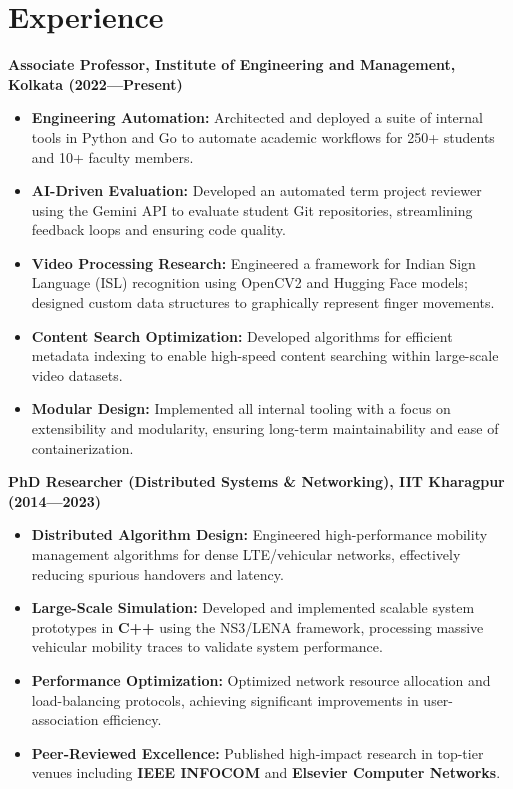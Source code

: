\section{Experience}
\begin{innerlist}
\item
\textbf{Associate Professor, Institute of Engineering and Management, Kolkata (2022—Present)}
\begin{itemize}
    \item \textbf{Engineering Automation:} Architected and deployed a suite of internal tools in Python and Go to automate academic workflows for 250+ students and 10+ faculty members.
    \item \textbf{AI-Driven Evaluation:} Developed an automated term project reviewer using the Gemini API to evaluate student Git repositories, streamlining feedback loops and ensuring code quality.
    \item \textbf{Video Processing Research:} Engineered a framework for Indian Sign Language (ISL) recognition using OpenCV2 and Hugging Face models; designed custom data structures to graphically represent finger movements.
    \item \textbf{Content Search Optimization:} Developed algorithms for efficient metadata indexing to enable high-speed content searching within large-scale video datasets.
    \item \textbf{Modular Design:} Implemented all internal tooling with a focus on extensibility and modularity, ensuring long-term maintainability and ease of containerization.
\end{itemize}

\item
\textbf{PhD Researcher (Distributed Systems \& Networking), IIT Kharagpur (2014—2023)}
\begin{itemize}
    \item \textbf{Distributed Algorithm Design:} Engineered high-performance mobility management algorithms for dense LTE/vehicular networks, effectively reducing spurious handovers and latency.
    \item \textbf{Large-Scale Simulation:} Developed and implemented scalable system prototypes in \textbf{C++} using the NS3/LENA framework, processing massive vehicular mobility traces to validate system performance.
    \item \textbf{Performance Optimization:} Optimized network resource allocation and load-balancing protocols, achieving significant improvements in user-association efficiency.
    \item \textbf{Peer-Reviewed Excellence:} Published high-impact research in top-tier venues including \textbf{IEEE INFOCOM} and \textbf{Elsevier Computer Networks}.
\end{itemize}


\end{innerlist}
